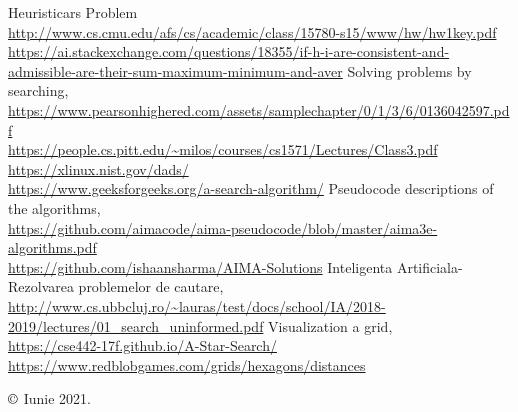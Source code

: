 \documentclass{article}
\begin{document}
\begin{flushleft}
\begin{thebibliography}{8}
        Heuristicars Problem 
        \textcolor{blue}{\\\url{http://www.cs.cmu.edu/afs/cs/academic/class/15780-s15/www/hw/hw1key.pdf}
        \\\url{https://ai.stackexchange.com/questions/18355/if-h-i-are-consistent-and-admissible-are-their-sum-maximum-minimum-and-aver}}
        Solving problems by searching,
        \textcolor{blue}{\\\url{https://www.pearsonhighered.com/assets/samplechapter/0/1/3/6/0136042597.pdf}
        \\\url{https://people.cs.pitt.edu/~milos/courses/cs1571/Lectures/Class3.pdf}
        \\\url{https://xlinux.nist.gov/dads/}
        \\\url{https://www.geeksforgeeks.org/a-search-algorithm/}}
        Pseudocode descriptions of the algorithms,
        \textcolor{blue}{\\\url{https://github.com/aimacode/aima-pseudocode/blob/master/aima3e-algorithms.pdf}
        \\\url{https://github.com/ishaansharma/AIMA-Solutions}}
        Inteligenta Artificiala-Rezolvarea problemelor de cautare,
        \textcolor{blue}{\\\url{http://www.cs.ubbcluj.ro/~lauras/test/docs/school/IA/2018-2019/lectures/01_search_uninformed.pdf}}
        Visualization a grid,
        \textcolor{blue}{\\\url{https://cse442-17f.github.io/A-Star-Search/}
        \\\url{https://www.redblobgames.com/grids/hexagons/distances}}
        \vspace{15cm}
\end{thebibliography}
\large \textcolor{blue}{\bfseries{$\copyright$}} Iunie 2021.
\end{flushleft}
\end{document}
